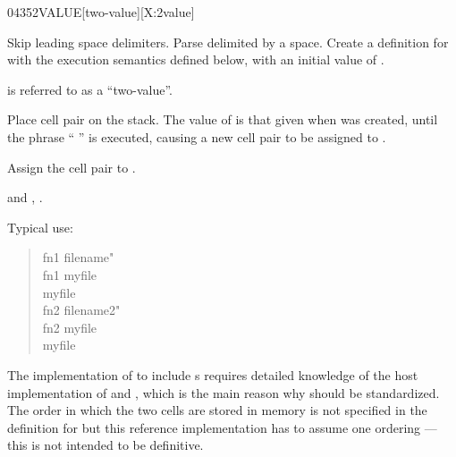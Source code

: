 
\begin{worddef}{0435}{2VALUE}[two-value][X:2value]
\item {}

	Skip leading space delimiters.  Parse  delimited by a
	space.  Create a definition for  with the execution
	semantics defined below, with an initial value of .

	 is referred to as a ``two-value''.

\execute[name]

	Place cell pair  on the stack.  The value of
	 is that given when  was created,
	until the phrase ``  '' is
	executed, causing a new cell pair  to be assigned
	to .


	Assign the cell pair  to .

\see {} and ,
	.

	\begin{rationale}
		Typical use:
		\begin{quote}\ttfamily
			\word{:} fn1  filename" \word{;} \\
			fn1  myfile \\
			myfile  \\[2ex]
			\word{:} fn2  filename2" \word{;} \\
			fn2  myfile \\
			myfile 
		\end{quote}
	\end{rationale}

	\begin{implement}
		\dffamily
		The implementation of  to include s
		requires detailed knowledge of the host implementation of
		 and , which is the main reason why
		 should be standardized.  The order in which
		the two cells are stored in memory is not specified in the
		definition for  but this reference implementation
		has to assume one ordering --- this is not intended to be
		definitive.


\end{implement}
\end{worddef}
